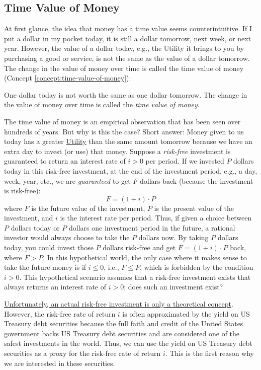\documentclass[11pt]{article}
\theoremstyle{definition}
\newcommand{\newterm}[1]{{\it #1}}
\begin{document}
\subsection{Time Value of Money}
At first glance, the idea that money has a time value seems counterintuitive. 
If I put a dollar in my pocket today, it is still a dollar tomorrow, next week, or next year. 
However, the value of a dollar today, e.g., the Utility it brings to you by purchasing a good or service, is not the same as the value of a dollar tomorrow.
The change in the value of money over time is called the time value of money (Concept \ref{concept:time-value-of-money}):
\begin{concept}\label{concept:time-value-of-money}
	One dollar today is not worth the same as one dollar tomorrow. 
	The change in the value of money over time is called the \newterm{time value of money}.
\end{concept}
The time value of money is an empirical observation that has been seen over hundreds of years. 
But why is this the case? Short answer: Money given to us today has a greater \href{https://en.wikipedia.org/wiki/Utility}{Utility} than the same amount tomorrow because we have an extra day to invest (or use) that money. Suppose a \emph{risk-free} investment is guaranteed to return an interest rate of $i>0$ per period.
If we invested $P$ dollars today in this risk-free investment, at the end of the investment period, e.g., a day, week, year, etc., 
we are \emph{guaranteed} to get $F$ dollars back (because the investment is risk-free):
\begin{equation*}
F = (1+i)\cdot{P}
\end{equation*}
where $F$ is the future value of the investment, $P$ is the present value of the investment, and $i$ is the interest rate per period.
Thus, if given a choice between $P$ dollars today or $P$ dollars one investment period in the future, 
a rational investor would always choose to take the $P$ dollars now. By taking $P$ dollars today, you could invest those $P$ dollars risk-free and get $F = (1+i)\cdot{P}$ back, where $F>P$. 
In this hypothetical world, the only case where it makes sense to take the future money is if $i\leq{0}$, i.e., $F\leq{P}$, which is forbidden by the condition $i>0$. 
This hypothetical scenario assumes that a risk-free investment exists that always returns an interest rate of $i>0$; 
does such an investment exist? 

\href{https://www.investopedia.com/terms/r/risk-freerate.asp}{Unfortunately, an actual risk-free investment is only a theoretical concept}. 
However, the risk-free rate of return $i$ is often approximated by the yield on US Treasury debt securities because the full faith and credit of the United States government backs US Treasury debt securities
and are considered one of the safest investments in the world. 
Thus, we can use the yield on US Treasury debt securities as a proxy for the risk-free rate of return $i$. 
This is the first reason why we are interested in these securities.
\end{document}
